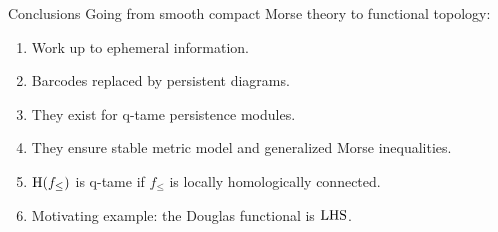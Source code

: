 \begin{frame}{Conclusions}
	\pause
	Going from smooth compact Morse theory to functional topology:\\
	\medskip\pause
	\begin{enumerate}
		\item Work up to ephemeral information.\\
		\medskip\pause
		\item Barcodes replaced by persistent diagrams.\\
		\medskip\pause
		\item They exist for q-tame persistence modules.\\
		\medskip\pause
		\item They ensure stable metric model and generalized Morse inequalities.\\
		\medskip\pause
		\item $\mathrm{H}(f_{\le})$ is q-tame if $f_{\le}$ is locally homologically connected.\\
		\medskip\pause
		\item Motivating example: the Douglas functional is $\mathrm{LHS}$.
	\end{enumerate}

\end{frame}